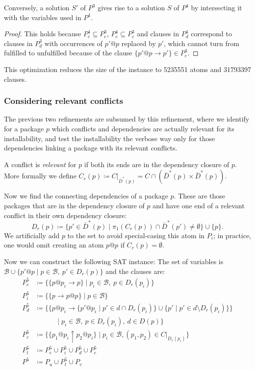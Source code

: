 \documentclass[halfparskip,11pt]{scrartcl}
\begin{document}
Conversely, a solution $S'$ of $P^3$ gives rise to a solution $S$ of $P^4$ by intersecting it with the variables used in $P^4$.

\begin{proof}
This holds because $P^4_e \subseteq P^3_e$, $P^4_c \subseteq P^3_c$ and clauses in $P^4_d$ correspond to clauses in $P^3_d$ with occurrences of $p'@p$ replaced by $p'$, which cannot turn from fulfilled to unfulfilled because of the clause $\{p'@p \to p'\} \in P^3_e$.
\end{proof}

This optimization reduces the size of the instance to 5235551 atoms and 31793397 clauses.


\subsubsection{Considering relevant conflicts}

The previous two refinements are subsumed by this refinement, where we identify for a package $p$ which conflicts and dependencies are actually relevant for its installability, and test the installability the verbose way only for those dependencies linking a package with its relevant conflicts.

A conflict is \emph{relevant} for $p$ if both its ends are in the dependency closure of $p$. More formally we define $C_r(p) \coloneqq C |_{\bar D^*(p)} = C\cap (\bar D^*(p) \times \bar D^*(p))$.

Now we find the connecting dependencies of a package $p$. These are those packages that are in the dependency closure of $p$ and have one end of a relevant conflict in their own dependency closure:
\[
D_r(p) \coloneqq \{p' \in \bar D^*(p) \mid \pi_1(C_r(p)) \cap \bar D^*(p') \ne \emptyset\} \cup \{p\}.
\]
We artificially add $p$ to the set to avoid special-casing this atom in $P_i$; in practice, one would omit creating an atom $p@p$ if $C_r(p)=\emptyset$.

Now we can construct the following SAT instance:
The set of variables is $\mathcal B \cup \{p'@p \mid p \in \mathcal B,\  p'\in D_r(p)\}$ and the clauses are: 
\begin{align*}
P^5_e &\coloneqq \{ \{p@p_i \to p\} \mid p_i \in\mathcal B,\ p\in D_r(p_i)\} \\
P^5_i &\coloneqq \{ \{p \to  p@p\} \mid p \in\mathcal B\} \\
P^5_d &\coloneqq \{ \{p@p_i \to \{p'@p_i \mid p'\in d\cap D_r(p_i)\} \cup \{p' \mid p'\in d\setminus D_r(p_i)\}\} \\
&\quad\quad\quad \mid p_i \in \mathcal B,\  p\in D_r(p_i),\ d \in D(p)\}\\
P^5_c &\coloneqq \{ \{p_1@p_i \uparrow p_2@p_i\} \mid p_i\in \mathcal B, (p_1,p_2)\in C|_{D_r(p_i)}\}\\
P^5_t &\coloneqq P^5_e \cup P^5_i \cup P^5_d \cup P^5_c \\
P^5 &\coloneqq P_u \cup P^5_t \cup P_v
\end{align*}
\end{document}
